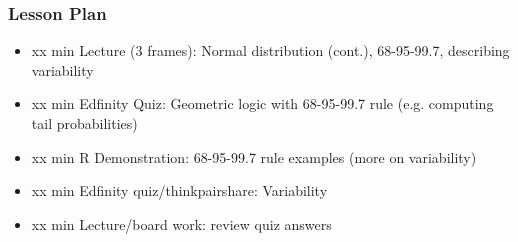 \begin{frame}
    \frametitle{Lesson Plan}
    \begin{itemize}
        \item xx min Lecture (3 frames): Normal distribution (cont.), 68-95-99.7, describing variability
        \item xx min Edfinity Quiz: Geometric logic with 68-95-99.7 rule (e.g. computing tail probabilities)
        \item xx min R Demonstration: 68-95-99.7 rule examples (more on variability)
        \item xx min Edfinity quiz/thinkpairshare: Variability
        \item xx min Lecture/board work: review quiz answers
    \end{itemize}
\end{frame}



